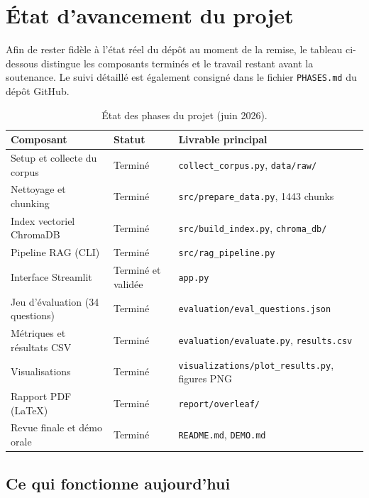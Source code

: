 \section{\'Etat d'avancement du projet}
\label{sec:etat}

Afin de rester fid\`ele \`a l'\'etat r\'eel du d\'ep\^ot au moment de la remise, le tableau
ci-dessous distingue les composants termin\'es et le travail restant avant la soutenance.
Le suivi d\'etaill\'e est \'egalement consign\'e dans le fichier \texttt{PHASES.md} du d\'ep\^ot
GitHub.

\begin{table}[H]
  \centering
  \caption{\'Etat des phases du projet (juin 2026).}
  \label{tab:phases}
  \begin{tabular}{@{}p{}p{}p{}@{}}
    \toprule
    \textbf{Composant} & \textbf{Statut} & \textbf{Livrable principal} \\
    \midrule
    Setup et collecte du corpus & Termin\'e & \texttt{collect\_corpus.py}, \texttt{data/raw/} \\
    Nettoyage et chunking & Termin\'e & \texttt{src/prepare\_data.py}, 1443 chunks \\
    Index vectoriel ChromaDB & Termin\'e & \texttt{src/build\_index.py}, \texttt{chroma\_db/} \\
    Pipeline RAG (CLI) & Termin\'e & \texttt{src/rag\_pipeline.py} \\
    Interface Streamlit & Termin\'e et valid\'ee & \texttt{app.py} \\
    Jeu d'\'evaluation (34 questions) & Termin\'e & \texttt{evaluation/eval\_questions.json} \\
    M\'etriques et r\'esultats CSV & Termin\'e & \texttt{evaluation/evaluate.py}, \texttt{results.csv} \\
    Visualisations & Termin\'e & \texttt{visualizations/plot\_results.py}, figures PNG \\
    Rapport PDF (LaTeX) & Termin\'e & \texttt{report/overleaf/} \\
    Revue finale et d\'emo orale & Termin\'e & \texttt{README.md}, \texttt{DEMO.md} \\
    \bottomrule
  \end{tabular}
\end{table}

\subsection{Ce qui fonctionne aujourd'hui}

